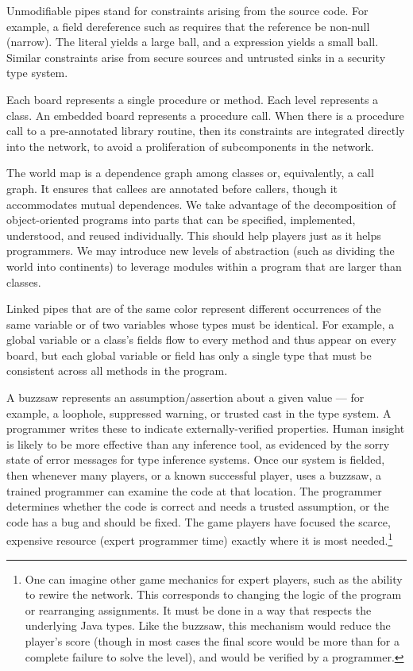 \documentclass{sig-alternate}
\def\<#1>{\codeid{#1}}
\newcommand{\codeid}[1]{\ifmmode{\mbox{\ttfamily{#1}}}\else{\ttfamily #1}\fi}
\begin{document}
Unmodifiable pipes stand for constraints arising from the source code.
For example, a field dereference such as \<x.f> requires that the
reference \<x> be non-null (narrow).  The literal \<null> yields a
large ball, and a \<new> expression yields a small ball.  Similar
constraints arise from secure sources and untrusted sinks in a
security type system.

Each board represents a single procedure or method.  Each level
represents a class.  An embedded board represents a procedure call.
When there is a procedure call to a pre-annotated library routine,
then its constraints are integrated directly into the network, to
avoid a proliferation of subcomponents in the network.

The world map is a dependence graph among classes or, equivalently, a
call graph.  It ensures that callees are annotated before callers,
though it accommodates mutual dependences.
We take advantage of the decomposition of object-oriented programs
into parts that can be specified, implemented, understood, and reused
individually.  This should help players just as it helps programmers.  We
may introduce new levels of abstraction (such as dividing the world into
continents) to leverage modules within a program that are larger than
classes.

Linked pipes that are of the same color represent different
occurrences of the same variable or of two variables whose types must
be identical.  For example, a global variable or a class's fields flow
to every method and thus appear on every board, but each global
variable or field has only a single type that must be consistent
across all methods in the program.

A buzzsaw represents an assumption/assertion about a given value --- for
example, a loophole, suppressed warning, or trusted cast in the type
system.  A programmer writes these to indicate externally-verified
properties.  Human insight is likely to be
more effective than any inference tool, as evidenced by the sorry
state of error messages for type inference systems.  Once our system is
fielded, then whenever many
players, or a known successful player, uses a buzzsaw, a trained
programmer can examine the code at that
location.  The programmer determines whether the code is
correct and needs a trusted assumption, or the code has a bug and
should be fixed.  The game players have focused the scarce, expensive
resource (expert programmer time) exactly where it is most
needed.\footnote{One can imagine other game mechanics for expert
  players, such as the ability to rewire the network.  This
  corresponds to changing the logic of the program or rearranging
  assignments.  It must be done in a way that respects the underlying
  Java types.  Like the buzzsaw, this mechanism would reduce the
  player's score (though in most cases the final score would be more
  than for a complete failure to solve the level), and would be
  verified by a programmer.}
\end{document}
